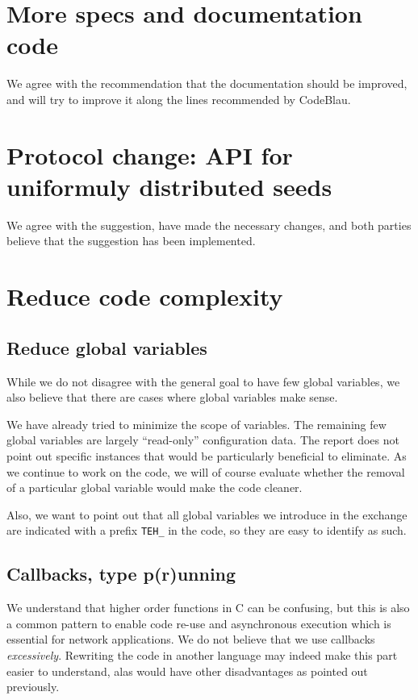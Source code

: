 \documentclass[11pt]{article}
\begin{document}
\section{More specs and documentation code}

We agree with the recommendation that the documentation should be improved,
and will try to improve it along the lines recommended by CodeBlau.

\section{Protocol change: API for uniformuly distributed seeds}

We agree with the suggestion, have made the necessary changes, and both
parties believe that the suggestion has been implemented.

\section{Reduce code complexity}

\subsection{Reduce global variables}

While we do not disagree with the general goal to have few global variables,
we also believe that there are cases where global variables make sense.

We have already tried to minimize the scope of variables. The remaining few
global variables are largely ``read-only'' configuration data. The report does
not point out specific instances that would be particularly beneficial to
eliminate. As we continue to work on the code, we will of course evaluate
whether the removal of a particular global variable would make the code
cleaner.

Also, we want to point out that all global variables we introduce
in the exchange are indicated with a prefix {\tt TEH\_} in the code, so they
are easy to identify as such.

\subsection{Callbacks, type p(r)unning}

We understand that higher order functions in C can be confusing, but this
is also a common pattern to enable code re-use and asynchronous execution
which is essential for network applications. We do not believe that we
use callbacks {\em excessively}.  Rewriting the code in another language
may indeed make this part easier to understand, alas would have other
disadvantages as pointed out previously.
\end{document}
